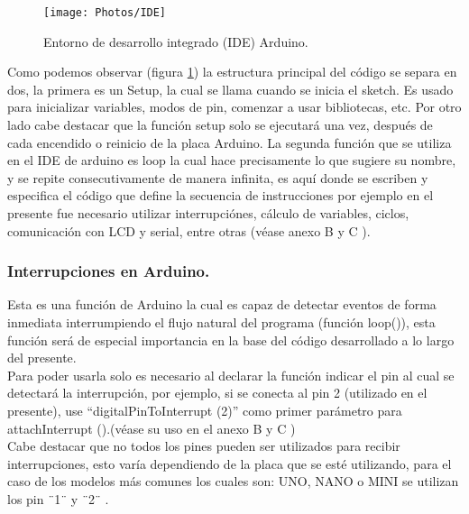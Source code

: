 \documentclass[11pt,letter
								]
								{article}
\begin{document}
\begin{figure}
\centering
\texttt{[image: Photos/IDE]}
\caption{Entorno de desarrollo integrado (IDE) Arduino.   } 
\label{IDE}
\end{figure}

Como podemos observar (figura \ref{IDE}) la estructura principal del código se separa en dos, la primera es un Setup, la cual   se llama cuando se inicia el sketch. Es usado  para inicializar variables, modos de pin, comenzar a usar bibliotecas, etc. Por otro lado  cabe destacar que  la función setup  solo se ejecutará una vez, después de cada encendido o reinicio de la placa Arduino. La segunda función que se utiliza en el IDE de arduino es   loop   la cual hace precisamente lo que sugiere su nombre, y se repite consecutivamente de manera infinita, es aquí donde se escriben y especifica el código que define  la secuencia de instrucciones por ejemplo en el presente fue necesario utilizar interrupciónes, cálculo de variables, ciclos, comunicación con LCD y serial, entre otras (véase anexo B y C ).



\subsubsection{Interrupciones en Arduino. }



Esta es una función de Arduino la cual es capaz de  detectar eventos de forma inmediata interrumpiendo el flujo natural del programa (función loop()), esta función será de especial importancia en la base del código desarrollado a lo largo del presente.\\

Para poder usarla  solo es necesario al declarar la función indicar el pin al cual se detectará la interrupción, por ejemplo, si se conecta al pin 2 (utilizado en el presente), use ``digitalPinToInterrupt (2)'' como primer parámetro para attachInterrupt ().(véase su uso en el anexo B y C )\\

Cabe destacar que no  todos los pines pueden ser utilizados para recibir interrupciones, esto varía dependiendo de la placa que se esté utilizando, 
para el caso de los modelos más comunes los cuales son: UNO, NANO o MINI se utilizan los pin  ¨1¨ y ¨2¨ \cite{TInterrup} .%
\end{document}
